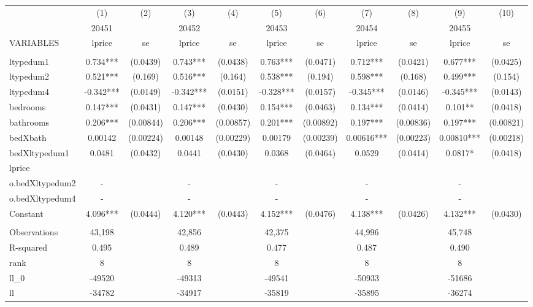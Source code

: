 \documentclass[]{article}
\begin{document}
\begin{tabular}{lcccccccccc} \hline
 & (1) & (2) & (3) & (4) & (5) & (6) & (7) & (8) & (9) & (10) \\
 & 20451 &  & 20452 &  & 20453 &  & 20454 &  & 20455 &  \\
VARIABLES & lprice & se & lprice & se & lprice & se & lprice & se & lprice & se \\ \hline
 &  &  &  &  &  &  &  &  &  &  \\
ltypedum1 & 0.734*** & (0.0439) & 0.743*** & (0.0438) & 0.763*** & (0.0471) & 0.712*** & (0.0421) & 0.677*** & (0.0425) \\
ltypedum2 & 0.521*** & (0.169) & 0.516*** & (0.164) & 0.538*** & (0.194) & 0.598*** & (0.168) & 0.499*** & (0.154) \\
ltypedum4 & -0.342*** & (0.0149) & -0.342*** & (0.0151) & -0.328*** & (0.0157) & -0.345*** & (0.0146) & -0.345*** & (0.0143) \\
bedrooms & 0.147*** & (0.0431) & 0.147*** & (0.0430) & 0.154*** & (0.0463) & 0.134*** & (0.0414) & 0.101** & (0.0418) \\
bathrooms & 0.206*** & (0.00844) & 0.206*** & (0.00857) & 0.201*** & (0.00892) & 0.197*** & (0.00836) & 0.197*** & (0.00821) \\
bedXbath & 0.00142 & (0.00224) & 0.00148 & (0.00229) & 0.00179 & (0.00239) & 0.00616*** & (0.00223) & 0.00810*** & (0.00218) \\
bedXltypedum1 & 0.0481 & (0.0432) & 0.0441 & (0.0430) & 0.0368 & (0.0464) & 0.0529 & (0.0414) & 0.0817* & (0.0418) \\
lprice &  &  &  &  &  &  &  &  &  &  \\
o.bedXltypedum2 & - &  & - &  & - &  & - &  & - &  \\
o.bedXltypedum4 & - &  & - &  & - &  & - &  & - &  \\
Constant & 4.096*** & (0.0444) & 4.120*** & (0.0443) & 4.152*** & (0.0476) & 4.138*** & (0.0426) & 4.132*** & (0.0430) \\
 &  &  &  &  &  &  &  &  &  &  \\
Observations & 43,198 &  & 42,856 &  & 42,375 &  & 44,996 &  & 45,748 &  \\
R-squared & 0.495 &  & 0.489 &  & 0.477 &  & 0.487 &  & 0.490 &  \\
rank & 8 &  & 8 &  & 8 &  & 8 &  & 8 &  \\
ll\_0 & -49520 &  & -49313 &  & -49541 &  & -50933 &  & -51686 &  \\
ll & -34782 &  & -34917 &  & -35819 &  & -35895 &  & -36274 &  \\

\end{tabular}
\end{document}
